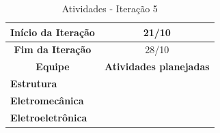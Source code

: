 \begin{table}[!h]
\centering
\caption{Atividades - Iteração 5}
\label{tab:iteracao5}
\begin{tabular}{|l|l|}
\hline
\multicolumn{1}{|c|}{\textbf{Início da Iteração}} & \multicolumn{1}{c|}{21/10}                                                                                                                                                                                                                                                                                         \\ \hline
\multicolumn{1}{|c|}{\textbf{Fim da Iteração}}    & \multicolumn{1}{c|}{28/10}                                                                                                                                                                                                                                                                                         \\ \hline
\multicolumn{1}{|c|}{\textbf{Equipe}}             & \multicolumn{1}{c|}{\textbf{Atividades planejadas}}                                                                                                                                                                                                                                                                \\ \hline
\textbf{Estrutura}                                &                                                                                                                                                                                                                                                                                                                    \\ \hline
\textbf{Eletromecânica}                           &                                                                                                                                                                                                                                                                                                                    \\ \hline
\textbf{Eletroeletrônica}                         &                                                                                                                                                                                                                                                                                                                    \\ \hline

\end{tabular}
\end{table}
